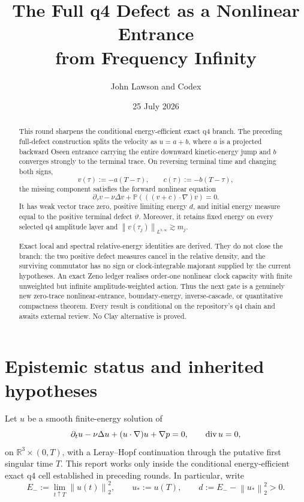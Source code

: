 \documentclass[11pt]{article}
\title{The Full q4 Defect as a Nonlinear Entrance\\
from Frequency Infinity}
\author{John Lawson and Codex}
\date{25 July 2026}
\theoremstyle{remark}
\newcommand{\R}{\mathbb R}
\newcommand{\Pp}{\mathbb P}
\newcommand{\norm}[1]{\left\|#1\right\|}
\newcommand{\diver}{\mathop{\rm div}}
\begin{document}
\maketitle

\begin{abstract}
This round sharpens the conditional energy-efficient exact q4 branch.
The preceding full-defect construction splits the velocity as \(u=a+b\),
where \(a\) is a projected backward Oseen entrance carrying the entire
downward kinetic-energy jump and \(b\) converges strongly to the terminal
trace.  On reversing terminal time and changing both signs,
\[
 v(\tau):=-a(T-\tau),\qquad c(\tau):=-b(T-\tau),
\]
the missing component satisfies the forward nonlinear equation
\[
 \partial_\tau v-\nu\Delta v+
 \Pp(((v+c)\cdot\nabla)v)=0.
\]
It has weak vector trace zero, positive limiting energy \(d\), and initial
energy measure equal to the positive terminal defect \(\vartheta\).
Moreover, it retains fixed energy on every selected q4 amplitude layer and
\(\norm{v(\tau_j)}_{L^{3,\infty}}\gtrsim m_j\).

Exact local and spectral relative-energy identities are derived.  They do
not close the branch: the two positive defect measures cancel in the
relative density, and the surviving commutator has no sign or
clock-integrable majorant supplied by the current hypotheses.  An exact
Zeno ledger realises order-one nonlinear clock capacity with finite
unweighted but infinite amplitude-weighted action.  Thus the next gate is
a genuinely new zero-trace nonlinear-entrance, boundary-energy,
inverse-cascade, or quantitative compactness theorem.  Every result is
conditional on the repository's q4 chain and awaits external review.  No
Clay alternative is proved.
\end{abstract}

\section{Epistemic status and inherited hypotheses}

Let \(u\) be a smooth finite-energy solution of
\begin{equation}
\label{eq:nse}
 \partial_tu-\nu\Delta u+(u\cdot\nabla)u+\nabla p=0,
 \qquad \diver u=0,
\end{equation}
on \(\R^3\times(0,T)\), with a Leray--Hopf continuation through the
putative first singular time \(T\).  This report works only inside the
conditional energy-efficient exact q4 cell established in preceding
rounds.  In particular, write
\begin{equation}
\label{eq:defect}
 E_-:=\lim_{t\uparrow T}\norm{u(t)}_2^2,\qquad
 u_*:=u(T),\qquad
 d:=E_--\norm{u_*}_2^2>0.
\end{equation}
\end{document}
